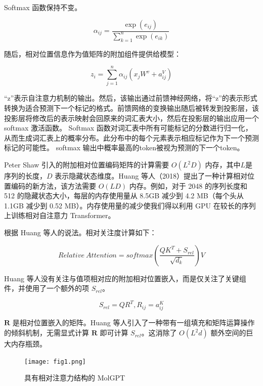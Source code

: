 \begin{translation}
Softmax 函数保持不变。

\begin{equation}
  \alpha_{ij} = \frac{\exp \left( e_{ij} \right)}{\sum_{k=1}^n \exp \left( e_{ik} \right)}
\end{equation}

随后，相对位置信息作为值矩阵的附加组件提供给模型：

\begin{equation}
  z_i = \sum_{j=1}^n \alpha_{ij} \left( x_jW^{v} + a_{ij}^V \right)
\end{equation}

“z”表示自注意力机制的输出。然后，该输出通过前馈神经网络，将“z”的表示形式转换为适合预测下一个标记的格式。前馈网络的变换输出随后被转发到投影层，该投影层将修改后的表示映射会回原来的词汇表大小，然后在投影层的输出应用一个 softmax 激活函数。 Softmax 函数对词汇表中所有可能标记的分数进行归一化，从而生成词汇表上的概率分布。此分布中的每个元素表示相应标记作为下一个预测标记的可能性。 softmax 输出中概率最高的token被视为预测的下一个token。

Peter Shaw 引入的附加相对位置编码矩阵的计算需要 $O(L^2D)$ 内存，其中$L$是序列的长度，$D$ 表示隐藏状态维度。Huang 等人（2018）提出了一种计算相对位置编码的新方法，该方法需要 $O(LD)$ 内存。例如，对于 2048 的序列长度和 512 的隐藏状态大小，每层的内存使用量从 8.5GB 减少到 4.2 MB（每个头从 1.1GB 减少到 0.52 MB）。内存使用量的减少使我们得以利用 GPU 在较长的序列上训练相对自注意力 Transformer。

根据 Huang 等人的说法。相对关注度计算如下：

\begin{equation}
  Relative\ Attention = softmax \left( \frac{QK^T + S_{rel}}{\sqrt{d_k}} \right)V
\end{equation}

Huang 等人没有关注与值项相对应的附加相对位置嵌入，而是仅关注了关键组件，并使用了一个额外的项 $S_{rel}$。

\begin{equation}
  S_{rel} = QR^T, R_{ij} = a_{ij}^K
\end{equation}

$\boldsymbol{R}$ 是相对位置嵌入的矩阵。Huang 等人引入了一种带有一组填充和矩阵运算操作的倾斜机制，无需显式计算 $\boldsymbol{R}$ 即可计算 $S_{rel}$。这消除了 $O(L^2d)$ 额外空间的巨大内存瓶颈。

\begin{figure}[H]
  \centering
  \texttt{[image: fig1.png]}
  \caption{具有相对注意力结构的 MolGPT}
  \label{fig:1}
\end{figure}



\end{translation}
